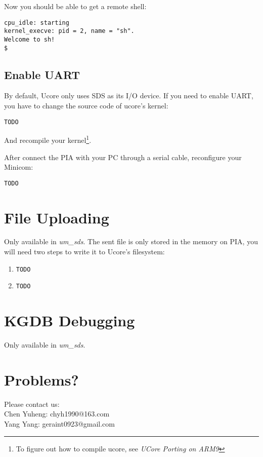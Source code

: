 \documentclass[a4paper]{article}
\begin{document}
Now you should be able to get a remote shell:
\begin{verbatim}
cpu_idle: starting
kernel_execve: pid = 2, name = "sh".
Welcome to sh!
$                                   
\end{verbatim}

\subsection{Enable UART}
By default, Ucore only uses SDS as its I/O device. If you need
to enable UART, you have to change the source code of ucore's kernel:

\begin{verbatim}
TODO
\end{verbatim}

And recompile your kernel\footnote{To figure out how to compile
ucore, see \emph{UCore Porting on ARM9}}.

After connect the PIA with your PC through a serial cable, 
reconfigure your Minicom:

\begin{verbatim}
TODO
\end{verbatim}

\section{File Uploading}
Only available in \emph{um\_sds}. The sent file is only stored
in the memory on PIA, you will need two steps to write it to
Ucore's filesystem:
\begin{enumerate}
\item
\begin{verbatim}
TODO
\end{verbatim}

\item
\begin{verbatim}
TODO
\end{verbatim}
\end{enumerate}

\section{KGDB Debugging}
Only available in \emph{um\_sds}. 

\section{Problems?}
Please contact us: \\
Chen Yuheng: chyh1990@163.com\\
Yang Yang: geraint0923@gmail.com
\end{document}
